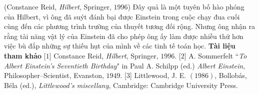 \begin{multicols}{2}
	\vskip 0.1cm
	\hfill (Constance Reid, \textit{Hilbert}, Springer,  $1996$)
	\vskip 0.1cm
	Đây quả là một tuyên bố hào phóng của Hilbert, vì ông đã suýt đánh bại được Einstein trong cuộc chạy đua cuối cùng đến các phương trình trường của thuyết tương đối rộng. Nhưng ông nhận ra rằng tài năng vật lý của Einstein đã cho phép ông ấy làm được nhiều thứ hơn việc bù đắp những sự thiếu hụt của mình về các tinh tế toán học.
	\vskip 0.1cm
	\textbf{\color{quantoan}Tài liệu tham khảo}
	\vskip 0.1cm
	[$1$]	Constance Reid, \textit{Hilbert}, Springer,  $1996$.
	\vskip 0.1cm
	[$2$]	A. Sommerfelt ``\textit{To Albert Einstein's Seventieth Birthday}" in Paul A. Schilpp (ed.) \textit{Albert Einstein}, Philosopher--Scientist, Evanston, $1949$.
	\vskip 0.1cm
	[$3$] Littlewood, J. E. $(1986)$, Bollobás, Béla (ed.), \textit{Littlewood's miscellany}, Cambridge: Cambridge University Press.
\end{multicols}